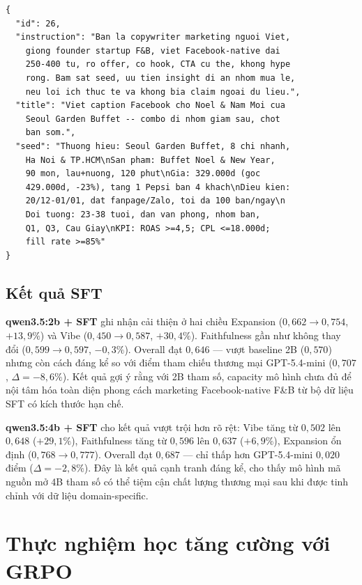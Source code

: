 \begin{lstlisting}[language={},basicstyle=\scriptsize\ttfamily,
  breaklines=true,frame=single,numbers=none,
  caption={Ví dụ mẫu trong tập kiểm thử (không có trường content).}]
{
  "id": 26,
  "instruction": "Ban la copywriter marketing nguoi Viet,
    giong founder startup F&B, viet Facebook-native dai
    250-400 tu, ro offer, co hook, CTA cu the, khong hype
    rong. Bam sat seed, uu tien insight di an nhom mua le,
    neu loi ich thuc te va khong bia claim ngoai du lieu.",
  "title": "Viet caption Facebook cho Noel & Nam Moi cua
    Seoul Garden Buffet -- combo di nhom giam sau, chot
    ban som.",
  "seed": "Thuong hieu: Seoul Garden Buffet, 8 chi nhanh,
    Ha Noi & TP.HCM\nSan pham: Buffet Noel & New Year,
    90 mon, lau+nuong, 120 phut\nGia: 329.000d (goc
    429.000d, -23%), tang 1 Pepsi ban 4 khach\nDieu kien:
    20/12-01/01, dat fanpage/Zalo, toi da 100 ban/ngay\n
    Doi tuong: 23-38 tuoi, dan van phong, nhom ban,
    Q1, Q3, Cau Giay\nKPI: ROAS >=4,5; CPL <=18.000d;
    fill rate >=85%"
}
\end{lstlisting}

\subsection{Kết quả SFT}

\textbf{qwen3.5:2b + SFT} ghi nhận cải thiện ở hai chiều Expansion
($0{,}662 \to 0{,}754$, $+13{,}9\%$) và Vibe ($0{,}450 \to 0{,}587$,
$+30{,}4\%$). Faithfulness gần như không thay đổi ($0{,}599 \to
0{,}597$, $-0{,}3\%$). Overall đạt $0{,}646$ --- vượt baseline 2B
($0{,}570$) nhưng còn cách đáng kể so với điểm tham chiếu thương mại
GPT-5.4-mini ($0{,}707$, $\Delta = -8{,}6\%$). Kết quả gợi ý rằng với
2B tham số, capacity mô hình chưa đủ để nội tâm hóa toàn diện phong
cách marketing Facebook-native F\&B từ bộ dữ liệu SFT có kích thước
hạn chế.

\textbf{qwen3.5:4b + SFT} cho kết quả vượt trội hơn rõ rệt: Vibe tăng
từ $0{,}502$ lên $0{,}648$ ($+29{,}1\%$), Faithfulness tăng từ $0{,}596$
lên $0{,}637$ ($+6{,}9\%$), Expansion ổn định ($0{,}768 \to 0{,}777$).
Overall đạt $0{,}687$ --- chỉ thấp hơn GPT-5.4-mini $0{,}020$ điểm
($\Delta = -2{,}8\%$). Đây là kết quả cạnh tranh đáng kể, cho thấy mô
hình mã nguồn mở 4B tham số có thể tiệm cận chất lượng thương mại sau
khi được tinh chỉnh với dữ liệu domain-specific.

\section{Thực nghiệm học tăng cường với GRPO}
\label{sec:grpo-result}

